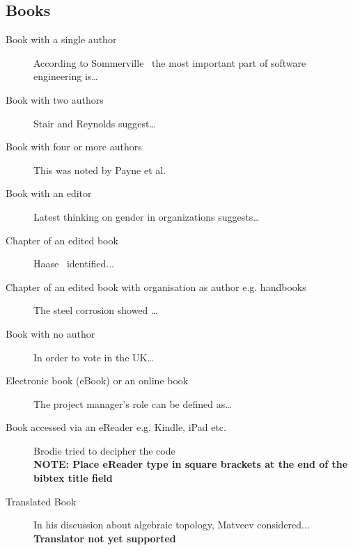 \documentclass[12pt,oneside]{book} %
\begin{document}
\subsection{Books}
\label{sec:NumberedBooks}
\begin{description}
\item[Book with a single author] According to Sommerville~\cite[p.35]{sommerville_software_2007} the most important part of software engineering is…
\item[Book with two authors] Stair and Reynolds \cite[p.65]{stair_principles_2010} suggest…
\item[Book with four or more authors] This was noted by Payne et al. \cite[p.15]{payne_relationship_1995}
\item[Book with an editor] Latest thinking on gender in organizations
suggests… \cite{kumra_oxford_2014}
\item[Chapter of an edited book] Haase~\cite[p.35]{haase_standards_2005} identified...
\item[Chapter of an edited book with organisation as author e.g. handbooks] 
The steel corrosion showed …\cite{asm_international_corrosion_1998}
\item[Book with no author] In order to vote in the UK…\cite{noauthor_whitakers_2011}
\item[Electronic book (eBook) or an online book] The project manager’s role can be defined as… \cite{kerzer_project_2009}
\item[Book accessed via an eReader e.g. Kindle, iPad etc.]
Brodie tried to decipher the \linebreak code~\cite{dennis_secret_2012}\\
\textbf{NOTE: Place eReader type in square brackets at the end of the bibtex title field}
\item[Translated Book] In his discussion about algebraic
topology, Matveev \cite[p.17]{matvev_lectures_2006} considered...\\
\textbf{Translator not yet supported}
\end{description}
\end{document}
